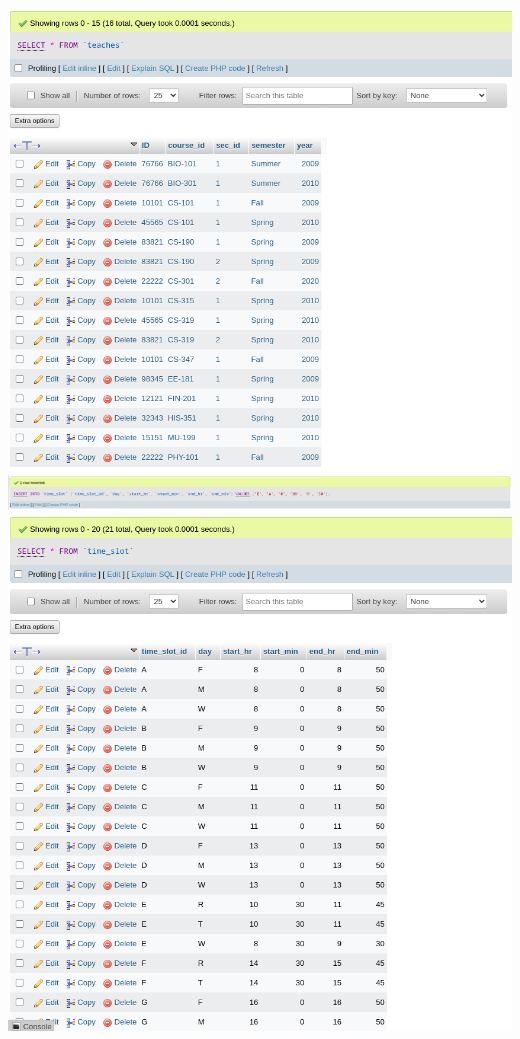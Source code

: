 \documentclass{article}
\begin{document}
\begin{center}
    \includegraphics[scale=0.5]{7-10s.png}
    \newpage
    \includegraphics[scale=0.5]{7-11i.png}
    \includegraphics[scale=0.5]{7-11s.png}
    \newpage
\end{center}
\end{document}
